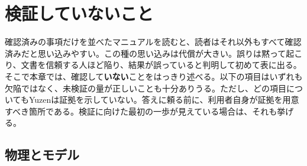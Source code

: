 \chapter{検証していないこと}
\label{ch:notverified}

確認済みの事項だけを並べたマニュアルを読むと、読者はそれ以外もすべて確認済みだと思い込みやすい。この種の思い込みは代償が大きい。誤りは黙って起こり、文書を信頼する人ほど陥り、結果が誤っていると判明して初めて表に出る。そこで本章では、確認して\textbf{いない}ことをはっきり述べる。以下の項目はいずれも欠陥ではなく、未検証の量が正しいことも十分ありうる。ただし、どの項目についてもYuzenは証拠を示していない。答えに頼る前に、利用者自身が証拠を用意すべき箇所である。検証に向けた最初の一歩が見えている場合は、それも挙げる。

\section{物理とモデル}
\label{sec:notverified:physics}

